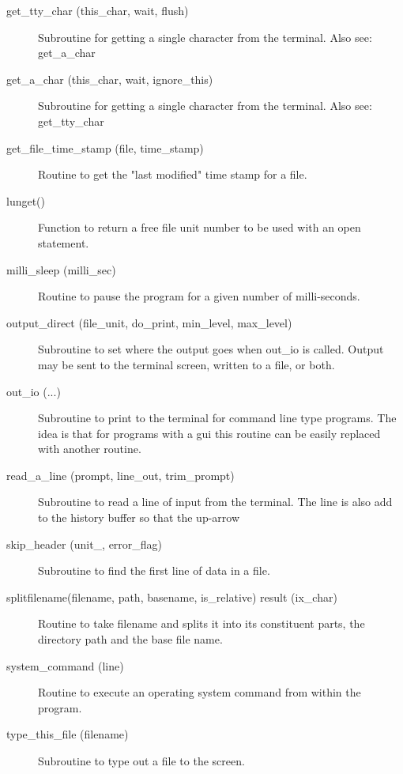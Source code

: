 \begin{description}
\label{r:get.tty.char}
\item[get_tty_char (this_char, wait, flush)] \Newline 
Subroutine for getting a single character from the terminal.
Also see: get_a_char

\label{r:get.a.char}
\item[get_a_char (this_char, wait, ignore_this)] \Newline 
Subroutine for getting a single character from the terminal.
Also see: get_tty_char

\label{r:get.file.time.stamp}
\item[get_file_time_stamp (file, time_stamp)] \Newline 
Routine to get the "last modified" time stamp for a file.

\label{r:lunget}
\item[lunget()] \Newline 
Function to return a free file unit number to be used with an open statement.

\label{r:milli.sleep}
\item[milli_sleep (milli_sec)] \Newline 
Routine to pause the program for a given number of milli-seconds.

\label{r:output.direct}
\item[output_direct (file_unit, do_print, min_level, max_level)] \Newline 
Subroutine to set where the output goes when out_io is called.
Output may be sent to the terminal screen, written to a file, or both.

\label{r:out.io}
\item[out_io (...)] \Newline 
Subroutine to print to the terminal for command line type programs.
The idea is that for programs with a gui this routine can be easily
replaced with another routine.

\label{r:read.a.line}
\item[read_a_line (prompt, line_out, trim_prompt)] \Newline 
Subroutine to read a line of input from the terminal.
The line is also add to the history buffer so that the up-arrow

\label{r:skip.header}
\item[skip_header (unit_, error_flag)] \Newline 
Subroutine to find the first line of data in a file. 

\label{r:splitfilename}
\item[splitfilename(filename, path, basename, is_relative) result (ix_char)] \Newline 
Routine to take filename and splits it into its constituent parts, 
the directory path and the base file name.  

\label{r:system.command}
\item[system_command (line)] \Newline 
Routine to execute an operating system command from within the program.

\label{r:type.this.file}
\item[type_this_file (filename)] \Newline 
Subroutine to type out a file to the screen.

\end{description}

